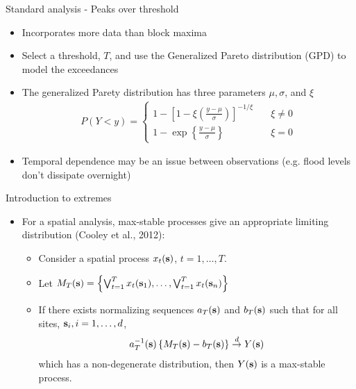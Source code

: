 \documentclass{beamer}
\begin{document}
\begin{frame}{Standard analysis - Peaks over threshold}
  \begin{itemize}  \setlength{\itemsep}{0.5em}
      \item Incorporates more data than block maxima
      \item Select a threshold, $T$, and use the Generalized Pareto distribution (GPD) to model the exceedances
      \item The generalized Parety distribution has three parameters $\mu, \sigma$, and $\xi$
      \begin{align*}
        P(Y < y) = \left\{ \begin{array}{ll}
          1 - \left[1 - \xi \left( \frac{ y - \mu }{ \sigma } \right) \right]^{-1 / \xi} & \quad \xi \neq 0 \\
          1 - \exp \left\{ \frac{ y - \mu }{ \sigma} \right\} & \quad \xi = 0
        \end{array}\right.
      \end{align*}
      \item Temporal dependence may be an issue between observations (e.g. flood levels don't dissipate overnight)
  \end{itemize}
\end{frame}

\begin{frame}{Introduction to extremes}
  \begin{itemize} \setlength{\itemsep}{0.5em}
    \item For a spatial analysis, max-stable processes give an appropriate limiting distribution (Cooley et al., 2012):
    \begin{itemize}
      \item Consider a spatial process $x_t(\mbox{\bf s})$, $t = 1, \ldots, T$.
      \item Let $M_T(\mbox{\bf s}) = \left\{ \bigvee_{t=1}^T x_t(\mbox{\bf s}_1), \ldots, \bigvee_{t=1}^T x_t(\mbox{\bf s}_n) \right\}$
      \item If there exists normalizing sequences $a_T(\mbox{\bf s})$ and $b_T(\mbox{\bf s})$ such
      that for all sites, $\mbox{\bf s}_i, i = 1, \ldots, d$,
      \begin{align*}
        a_T^{-1}(\mbox{\bf s}) \left\{ M_T(\mbox{\bf s}) - b_T(\mbox{\bf s}) \right\} \stackrel{d}{\rightarrow} Y(\mbox{\bf s})
      \end{align*}
      which has a non-degenerate distribution, then $Y(\mbox{\bf s})$ is a max-stable process.
    \end{itemize}
  \end{itemize}
\end{frame}
\end{document}
